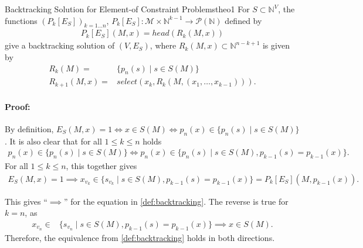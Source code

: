 \begin{theorem}{Backtracking Solution for Element-of Constraint Problems}{theo1}
    For $S\subset\mathbb N^V$, the functions $(P_k[E_S])_{k=1\dots n}$,
    $P_k[E_S]\colon\mathcal M\times\mathbb N^{k-1}\rightarrow\mathcal P(\mathbb N)$
    defined by
    \begin{align*}
        P_k[E_S](M,x)=head(R_k(M,x))
    \end{align*}
    give a backtracking solution of $(V,E_S)$, where
    $R_k(M,x)\subset\mathbb N^{n-k+1}$ is given by
    \begin{align*}
        R_k(M)={}&\{p_n(s)\mid s\in S(M)\}\\
        R_{k+1}(M,x)={}&select(x_k,R_k(M,(x_1,\dots,x_{k-1}))).
    \end{align*}
    \tcblower
    \paragraph*{Proof:} By definition,
    $E_S(M,x)=1\iff x\in S(M)\iff p_n(x)\in\{p_n(s)\mid s\in S(M)\}$.
    It is also clear that for all $1\leq k\leq n$ holds
    \begin{align*}
        p_n(x)\in\{p_n(s)\mid s\in S(M)\}\iff p_n(x)\in\{p_n(s)\mid s\in S(M),p_{k-1}(s)=p_{k-1}(x)\}.
    \end{align*}
    For all $1\leq k\leq n$, this together gives
    \begin{align*}
        E_S(M,x)=1\implies x_{v_k}\in\{s_{v_k}\mid s\in S(M),p_{k-1}(s)=p_{k-1}(x)\}=P_k[E_S](M,p_{k-1}(x)).
    \end{align*}

    This gives ``$\implies$'' for the equation in \autoref{def:backtracking}.
    The reverse is true for $k=n$, as
    \begin{align*}
        x_{v_n}\in{}&\{s_{v_n}\mid s\in S(M),p_{k-1}(s)=p_{k-1}(x)\}\implies x\in S(M).
    \end{align*}
    Therefore, the equivalence from \autoref{def:backtracking} holds in both directions.
\end{theorem}
